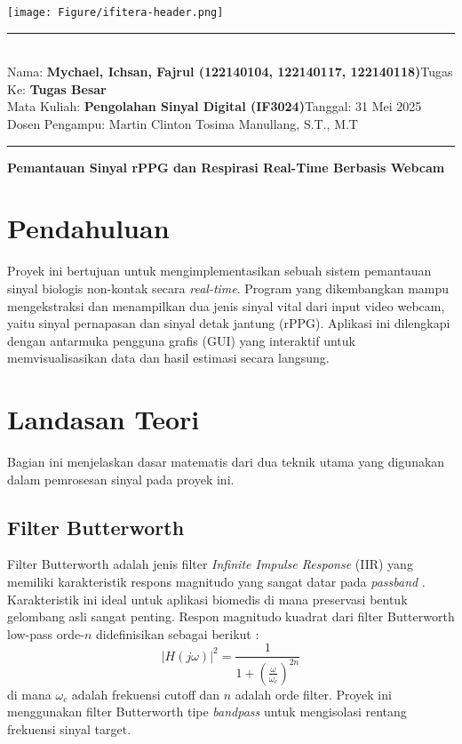 \documentclass[11pt,a4paper]{article}
\newcommand{\student}{\textbf{Mychael, Ichsan, Fajrul (122140104, 122140117, 122140118)}}
\newcommand{\course}{\textbf{Pengolahan Sinyal Digital (IF3024)}}
\newcommand{\assignment}{\textbf{Tugas Besar}}
\begin{document}
\thispagestyle{empty}
\begin{center}
	\texttt{[image: Figure/ifitera-header.png]}
	\vspace{0.1cm}
\end{center}
\noindent
\rule{17cm}{0.2cm}\\[0.3cm]
Nama: \student \hfill Tugas Ke: \assignment\\[0.1cm]
Mata Kuliah: \course \hfill Tanggal: 31 Mei 2025\\
Dosen Pengampu: Martin Clinton Tosima Manullang, S.T., M.T\\
\rule{17cm}{0.05cm}
\vspace{1cm}

\begin{center}
    {\bf Pemantauan Sinyal rPPG dan Respirasi Real-Time Berbasis Webcam}
\end{center}
\vspace{0.5cm}

\section{Pendahuluan}
Proyek ini bertujuan untuk mengimplementasikan sebuah sistem pemantauan sinyal biologis non-kontak secara \textit{real-time}. Program yang dikembangkan mampu mengekstraksi dan menampilkan dua jenis sinyal vital dari input video webcam, yaitu sinyal pernapasan dan sinyal detak jantung (rPPG). Aplikasi ini dilengkapi dengan antarmuka pengguna grafis (GUI) yang interaktif untuk memvisualisasikan data dan hasil estimasi secara langsung.

\section{Landasan Teori}
Bagian ini menjelaskan dasar matematis dari dua teknik utama yang digunakan dalam pemrosesan sinyal pada proyek ini.

\subsection{Filter Butterworth}
Filter Butterworth adalah jenis filter \textit{Infinite Impulse Response} (IIR) yang memiliki karakteristik respons magnitudo yang sangat datar pada \textit{passband} \cite{proakis2007}. Karakteristik ini ideal untuk aplikasi biomedis di mana preservasi bentuk gelombang asli sangat penting. Respon magnitudo kuadrat dari filter Butterworth low-pass orde-$n$ didefinisikan sebagai berikut \cite{oppenheim2010}:
\begin{equation}
|H(j\omega)|^2 = \frac{1}{1 + \left(\frac{\omega}{\omega_c}\right)^{2n}}
\end{equation}
di mana $\omega_c$ adalah frekuensi cutoff dan $n$ adalah orde filter. Proyek ini menggunakan filter Butterworth tipe \textit{bandpass} untuk mengisolasi rentang frekuensi sinyal target.
\end{document}

